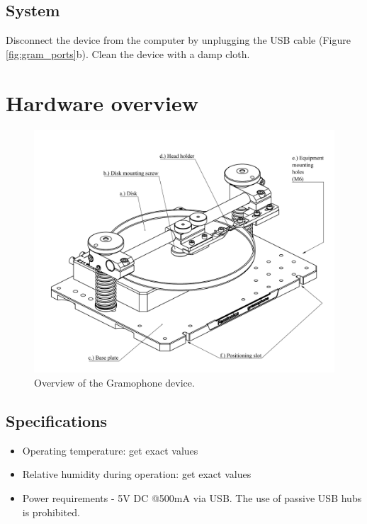 \documentclass[11pt,a4paper]{article}
\newcommand{\enote}[1]{\textcolor{RubineRed}{#1}}
\begin{document}
\subsection{System}
Disconnect the device from the computer by unplugging the USB cable (Figure \ref{fig:gram_ports}b). Clean the device with a damp cloth.

\newpage
\section{Hardware overview}
\begin{figure}[h] %
\centering
\includegraphics[clip, trim=1cm 0cm 0cm 1cm, width=1.00\textwidth]{labels_overview.PDF}
\caption{Overview of the Gramophone device.}
\label{fig:gram_overview}
\end{figure}


\subsection{Specifications}
\begin{itemize}
\item Operating temperature: \enote{get exact values}
\item Relative humidity during operation: \enote{get exact values}
\item Power requirements - 5V DC @500mA via USB. The use of passive USB hubs is prohibited.
\end{itemize}
\end{document}
